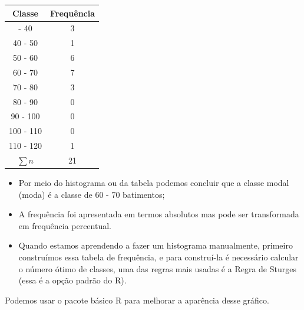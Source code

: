 \documentclass[
]{book}
\newcounter{none} %
\begin{document}
{\def\LTcaptype{none} %
\begin{longtable}[]{@{}cc@{}}
\toprule\noalign{}
Classe & Frequência \\
\midrule\noalign{}
\endhead
\bottomrule\noalign{}
\endlastfoot
30 - 40 & 3 \\
40 - 50 & 1 \\
50 - 60 & 6 \\
60 - 70 & 7 \\
70 - 80 & 3 \\
80 - 90 & 0 \\
90 - 100 & 0 \\
100 - 110 & 0 \\
110 - 120 & 1 \\
\(\sum n\) & 21 \\
\end{longtable}
}

\begin{itemize}
\item
  Por meio do histograma ou da tabela podemos concluir que a classe modal (moda) é a classe de 60 - 70 batimentos;
\item
  A frequência foi apresentada em termos absolutos mas pode ser transformada em frequência percentual.
\item
  Quando estamos aprendendo a fazer um histograma manualmente, primeiro construímos essa tabela de frequência, e para construí-la é necessário calcular o número ótimo de classes, uma das regras mais usadas é a Regra de Sturges (essa é a opção padrão do R).
\end{itemize}

Podemos usar o pacote básico R para melhorar a aparência desse gráfico.
\end{document}
